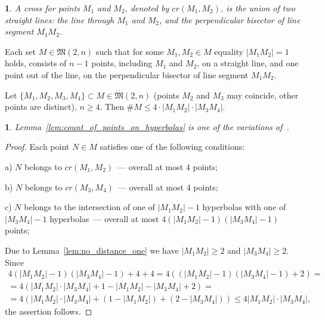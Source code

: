 \documentclass[11pt,twoside,draft
]{article}
\newtheorem{Definition}{\indent {\sc Definition}}
\newtheorem{Remark}{\indent {\sc Remark}}
\begin{document}
\begin{Definition}
	\cite[Definition 2.5]{my-pps-linear-bound-2019}
	A \textit{cross} for points $M_1$ and $M_2$, denoted by $cr(M_1,M_2)$, is the union of two straight lines:
	the line through $M_1$ and $M_2$,
	and the perpendicular bisector of line segment $M_1 M_2$.
\end{Definition}

\begin{lemma}
	\cite[Theorem 3.10]{my-pps-linear-bound-2019}
	\label{lem:no_distance_one}
	Each set $M\in\mathfrak{M}(2,n)$
	such that for some $M_1,M_2 \in M$ equality $|M_1 M_2|=1$ holds,
	consists of $n-1$ points, including $M_1$ and $M_2$, on a straight line,
	and one point out of the line, on the perpendicular bisector of line segment $M_1 M_2$.
\end{lemma}


\begin{lemma}
	\label{lem:count_of_points_on_hyperbolas}
	Let $\{M_1, M_2, M_3, M_4\} \subset M\in\overline{\mathfrak{M}}(2,n)$
	(points $M_2$ and $M_3$ may coincide, other points are distinct), $n\geq 4$.
	Then $\# M \leq 4 \cdot |M_1 M_2| \cdot |M_3 M_4|$.
\end{lemma}

\begin{Remark}
	Lemma~\ref{lem:count_of_points_on_hyperbolas} is one of the variations of~\cite{erdos1945integral}.
\end{Remark}

\begin{proof}[Proof]
	Each point $N\in M$ satisfies one of the following conditions:

	a) $N$ belongs to $cr(M_1,M_2)$~--- overall at most 4 points;

	b) $N$ belongs to $cr(M_3,M_4)$~--- overall at most 4 points;

	c) $N$ belongs to the intersection of one of $|M_1 M_2| - 1$ hyperbolas
	with one of $|M_3 M_4| - 1$ hyperbolas~--- overall at most $4 (|M_1 M_2| - 1)(|M_3 M_4| - 1)$ points;

	Due to Lemma~\ref{lem:no_distance_one} we have $|M_1 M_2| \geq 2$ and $|M_3 M_4| \geq 2$.
	Since
	\begin{multline}
		4 (|M_1 M_2| - 1)(|M_3 M_4| - 1) + 4 + 4
		=
		4 ( (|M_1 M_2| - 1)(|M_3 M_4| - 1) + 2)
		=
		\\=
		4 ( |M_1 M_2| \cdot |M_3 M_4| + 1 - |M_1 M_2| - |M_3 M_4| + 2)
		=
		\\=
		4 ( |M_1 M_2| \cdot |M_3 M_4| + (1 - |M_1 M_2|) + (2 - |M_3 M_4|))
		\leq
		4 |M_1 M_2| \cdot |M_3 M_4|
		,
	\end{multline}
	the assertion follows.
\end{proof}
\end{document}
